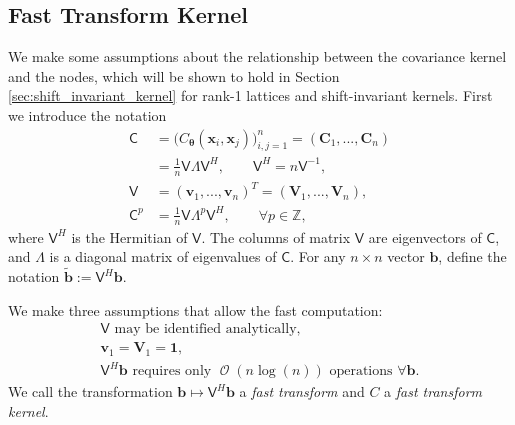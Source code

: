 \documentclass[twocolumn]{svjour3}          %
\DeclareMathOperator{\Order}{{\mathcal O}}
\newcommand{\bm}[1]{\boldsymbol{#1}}
\newcommand{\integers}{\mathbb{Z}}
\newcommand{\vtheta}{{\bm{\theta}}}
\newcommand{\vb}{\bm{b}}
\newcommand{\vC}{\bm{C}}
\newcommand{\vv}{\bm{v}}
\newcommand{\vV}{\bm{V}}
\newcommand{\vx}{\bm{x}}
\newcommand{\vone}{\bm{1}}
\newcommand{\mC}{\mathsf{C}}
\newcommand{\mLambda}{\mathsf{\Lambda}}
\newcommand{\mV}{\mathsf{V}}
\begin{document}
\subsection{Fast Transform Kernel}
We make some assumptions about the relationship between the covariance kernel and the nodes, which will be shown to hold in Section \ref{sec:shift_invariant_kernel} for rank-1 lattices and shift-invariant kernels.  First we introduce the notation
\begin{align}
\nonumber
\mC &= \Big(C_\vtheta(\vx_i,\vx_j)\Big)_{i,j=1}^n  = (\vC_1,...,\vC_n) 
\\
\label{eqn:ftk_factor}
&= \frac 1n \mV \mLambda \mV^H , 
\quad \quad \mV^H = n \mV^{-1}, \\
\nonumber
\mV &= (\vv_1,...,\vv_n)^T = (\vV_1,...,\vV_n), \\
\nonumber
\mC^p  &= \frac 1n \mV \mLambda^{p} \mV^H, \qquad \forall p \in \integers,
\end{align}
where $\mV^H$ is the Hermitian of $\mV$.  The columns of matrix $\mV$ are eigenvectors of $\mC$, and $\mLambda$ is a diagonal matrix of eigenvalues of $\mC$.
For any $n \times n$ vector $\vb$, define the notation  $\widetilde{\vb} := \mV^H \vb$.

We make three assumptions that allow the fast computation:
\begin{subequations} \label{fastcompAssump}
	\begin{gather}
	\label{fastcompAssumpA}
	\mV \text{ may be identified analytically}, \\
	\label{fastcompAssumpB}
	\vv_1 = \vV_1 = \vone, \\
	\label{fastcompAssumpC}
	\mV^H \vb  \text{ requires only $\Order(n \log(n))$ operations } \forall \vb.
	\end{gather}
\end{subequations}
We call the transformation $\vb \mapsto \mV^H \vb$ a \emph{fast transform} and $C$ a \emph{fast transform kernel}.  
\end{document}
